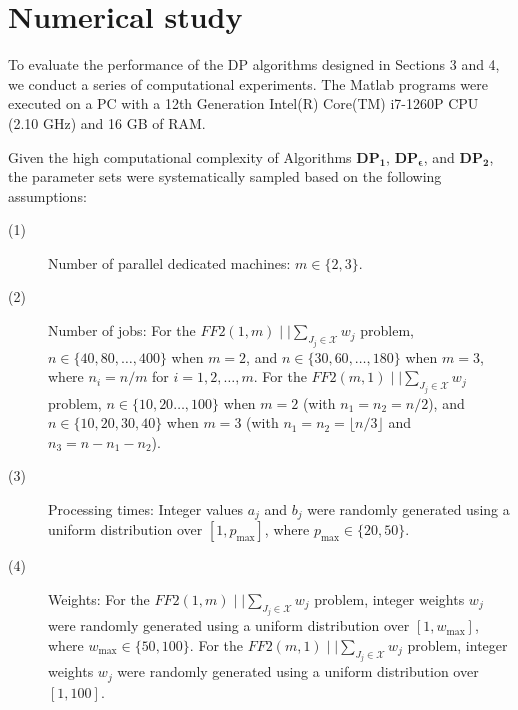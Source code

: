\documentclass[12pt, eqno, limlimits]{article}
\begin{document}
\begin{sloppypar}
\begin{center}
        \end{center}
        
        
        \section{Numerical study}
        
        To evaluate the performance of the DP algorithms designed in Sections 3 and 4, we conduct a series of computational experiments. The Matlab programs were executed on a PC with a 12th Generation Intel(R) Core(TM) i7-1260P CPU (2.10 GHz) and 16 GB of RAM.
        
        Given the high computational complexity of Algorithms $\mathbf{DP_1}$, $\mathbf{DP_{\epsilon}}$, and $\mathbf{DP_2}$, the parameter sets were systematically sampled based on the following assumptions:
        \begin{description}
            \item[(1)] Number of parallel dedicated machines: $m \in \{2, 3\}$.
            
            \item[(2)] Number of jobs: For the $FF2(1, m)\mid \mid \sum_{J_j \in \mathcal{X}} w_j$ problem, $n \in \{40, 80, \ldots, 400\}$ when $m=2$, and $n \in \{30, 60, \ldots, 180\}$ when $m=3$, where $n_i=n/m$ for $i=1, 2, \ldots, m$. For the $FF2(m, 1)\mid \mid \sum_{J_j \in \mathcal{X}} w_j$ problem, $n \in \{10, 20 \ldots, 100\}$ when $m=2$ (with $n_1=n_2= n/2$), and $n \in \{10, 20, 30, 40\}$ when $m=3$ (with $n_1=n_2= \lfloor n/3 \rfloor$   and $n_3=n-n_1-n_2$).
            
            \item[(3)] Processing times: Integer values $a_j$ and $b_j$ were randomly generated using a uniform distribution over  $[1, p_{\max}]$, where $p_{\max} \in \{20, 50\}$.
            
            \item[(4)] Weights: For the $FF2(1, m)\mid \mid \sum_{J_j \in \mathcal{X}} w_j$ problem, integer weights $w_j$ were randomly generated using a uniform distribution over $[1, w_{\max}]$, where $w_{\max} \in \{50, 100\}$. For the $FF2(m, 1)\mid \mid \sum_{J_j \in \mathcal{X}} w_j$ problem, integer weights $w_j$ were randomly generated using a uniform distribution over $[1, 100]$.
            

\end{description}
\end{sloppypar}
\end{document}

